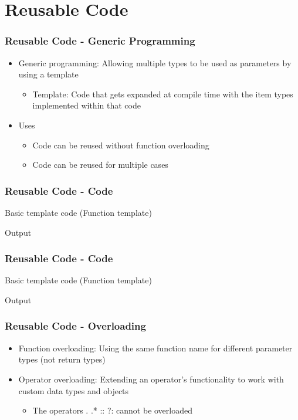 \section{Reusable Code}
\begin{frame}\frametitle{Reusable Code - Generic Programming}
\begin{itemize}
\item Generic programming: Allowing multiple types to be used as parameters by using a template
	\begin{itemize}
	\item Template: Code that gets expanded at compile time with the item types implemented within that code
	\end{itemize}
\item Uses
	\begin{itemize}
	\item Code can be reused without function overloading
	\item Code can be reused for multiple cases
	\end{itemize}
\end{itemize}
\end{frame}

\begin{frame}\frametitle{Reusable Code - Code}
Basic template code (Function template)


Output

\end{frame}

\begin{frame}\frametitle{Reusable Code - Code}
Basic template code (Function template)


Output

\end{frame}

\begin{frame}\frametitle{Reusable Code - Overloading}
\begin{itemize}
\item Function overloading: Using the same function name for different parameter types (not return types)
\item Operator overloading: Extending an operator's functionality to work with custom data types and objects
	\begin{itemize}
	\item The operators . .* :: ?: cannot be overloaded
	\end{itemize}
\end{itemize}
\end{frame}

